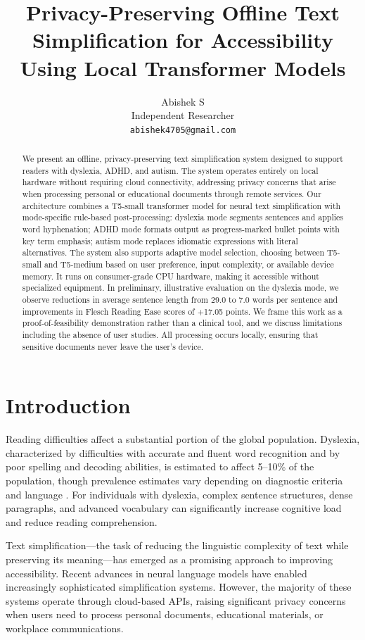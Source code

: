\documentclass[11pt]{article}
\title{Privacy-Preserving Offline Text Simplification for Accessibility Using Local Transformer Models}
\author{
  Abishek S \\
  Independent Researcher \\
  \texttt{abishek4705@gmail.com}
}
\date{}
\begin{document}
\maketitle

\begin{abstract}
We present an offline, privacy-preserving text simplification system designed to support readers with dyslexia, ADHD, and autism. The system operates entirely on local hardware without requiring cloud connectivity, addressing privacy concerns that arise when processing personal or educational documents through remote services. Our architecture combines a T5-small transformer model for neural text simplification with mode-specific rule-based post-processing: dyslexia mode segments sentences and applies word hyphenation; ADHD mode formats output as progress-marked bullet points with key term emphasis; autism mode replaces idiomatic expressions with literal alternatives. The system also supports adaptive model selection, choosing between T5-small and T5-medium based on user preference, input complexity, or available device memory. It runs on consumer-grade CPU hardware, making it accessible without specialized equipment. In preliminary, illustrative evaluation on the dyslexia mode, we observe reductions in average sentence length from 29.0 to 7.0 words per sentence and improvements in Flesch Reading Ease scores of +17.05 points. We frame this work as a proof-of-feasibility demonstration rather than a clinical tool, and we discuss limitations including the absence of user studies. All processing occurs locally, ensuring that sensitive documents never leave the user's device.
\end{abstract}

\section{Introduction}

Reading difficulties affect a substantial portion of the global population. Dyslexia, characterized by difficulties with accurate and fluent word recognition and by poor spelling and decoding abilities, is estimated to affect 5--10\% of the population, though prevalence estimates vary depending on diagnostic criteria and language \citep{snowling2000}. For individuals with dyslexia, complex sentence structures, dense paragraphs, and advanced vocabulary can significantly increase cognitive load and reduce reading comprehension.

Text simplification---the task of reducing the linguistic complexity of text while preserving its meaning---has emerged as a promising approach to improving accessibility. Recent advances in neural language models have enabled increasingly sophisticated simplification systems. However, the majority of these systems operate through cloud-based APIs, raising significant privacy concerns when users need to process personal documents, educational materials, or workplace communications.
\end{document}
